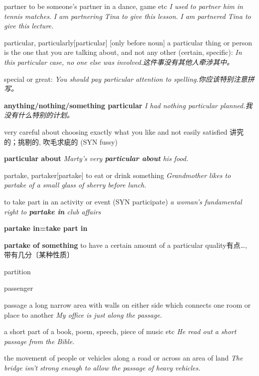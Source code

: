 \begin{DefWord}{partner}
    to be someone's partner in a dance, game etc
    \textit{I used to partner him in tennis matches.}
    \textit{I am partnering Tina to give this lesson.}
    \textit{I am partnered Tina to give this lecture.}
\end{DefWord}

\begin{DefWord}{particular, particularly}[particular]
    [only before noun] a particular thing or person is the one that you are talking about, and not any other (certain, specific):
    \textit{In this particular case, no one else was involved.这件事没有其他人牵涉其中。 }

    special or great:
    \textit{You should pay particular attention to spelling.你应该特别注意拼写。 }
    
    \textbf{anything/nothing/something particular}
    \textit{I had nothing particular planned.我没有什么特别的计划。 }

    very careful about choosing exactly what you like and not easily satisfied 讲究的；挑剔的, 吹毛求疵的 (SYN  fussy)
    
    \textbf{particular about}
    \textit{Marty's very \textbf{particular about} his food.}

\end{DefWord}

\begin{DefWord}{partake, partaker}[partake]
    to eat or drink something
    \textit{Grandmother likes to partake of a small glass of sherry before lunch.}

    to take part in an activity or event
    (SYN  participate)
    \textit{a woman's fundamental right to \textbf{partake in} club affairs}

    \textbf{partake in=take part in}

    \textbf{partake of something} 
    to have a certain amount of a particular quality有点…, 带有几分〔某种性质〕
\end{DefWord}

\begin{DefWord}{partition}
\end{DefWord}

\begin{DefWord}{passenger}
\end{DefWord}

\begin{DefWord}{passage}
    a long narrow area with walls on either side which connects one room or place to another
    \textit{My office is just along the passage.}

    a short part of a book, poem, speech, piece of music etc
    \textit{He read out a short passage from the Bible.}

    the movement of people or vehicles along a road or across an area of land
    \textit{The bridge isn't strong enough to allow the passage of heavy vehicles.}
\end{DefWord}

